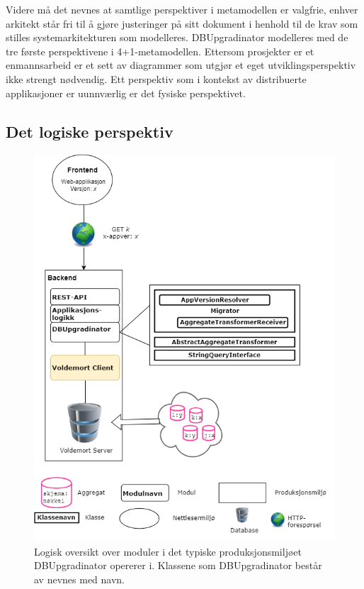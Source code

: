 Videre må det nevnes at samtlige perspektiver i metamodellen er valgfrie, enhver arkitekt står fri til å gjøre justeringer på sitt dokument i henhold til de krav som stilles systemarkitekturen som modelleres. DBUpgradinator modelleres med de tre første perspektivene i 4+1-metamodellen. Ettersom prosjekter er et enmannsarbeid er et sett av diagrammer som utgjør et eget utviklingsperspektiv ikke strengt nødvendig. Ett perspektiv som i kontekst av distribuerte applikasjoner er uunnværlig er det fysiske perspektivet.

\subsection{Det logiske perspektiv}
\begin{figure}[hbtp]
    \centering
    \includegraphics[scale=0.6]{fig/dbupgradinator-logisk-1.png}
    \caption{Logisk oversikt over moduler i det typiske produksjonsmiljøet DBUpgradinator opererer i. Klassene som DBUpgradinator består av nevnes med navn.}
    \label{fig5}
\end{figure}

